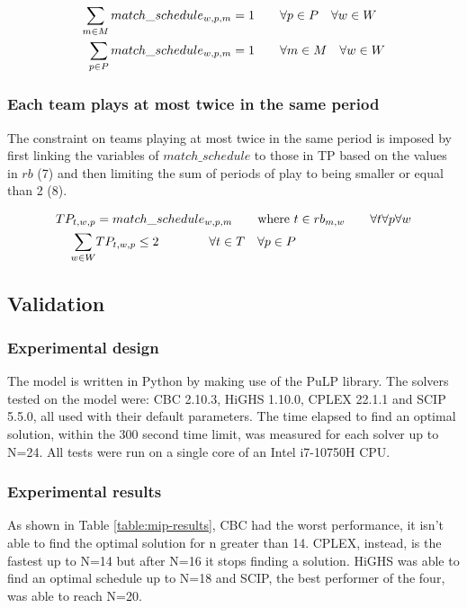 \begin{align}
    \sum_{m \in M} match\_schedule_{w,p,m} &= 1 \hspace{20px} \forall p \in P \hspace{10px} \forall w \in W\\
    \sum_{p \in P} match\_schedule_{w,p,m} &= 1 \hspace{20px} \forall m \in M \hspace{10px}\forall w \in W
\end{align}

\subsubsection{Each team plays at most twice in the same period}
The constraint on teams playing at most twice in the same period is imposed by first linking the variables of $match\_schedule$ to those in TP based on the values in $rb$ (7) and then limiting the sum of periods of play to being smaller or equal than 2 (8). 

\begin{align}
    TP_{t,w,p} &= match\_schedule_{w,p,m} \hspace{20px} \text{where}\ t \in rb_{m, w} \hspace{20px} \forall t \forall p  \forall w\\
    \sum_{w \in W} &TP_{t,w,p} \leq 2 \hspace{40px} \forall t \in T \hspace{10px} \forall p \in P
\end{align}

\subsection{Validation}
\subsubsection*{Experimental design}
The model is written in Python by making use of the PuLP library. The solvers tested on the model were: CBC 2.10.3, HiGHS 1.10.0, CPLEX 22.1.1 and SCIP 5.5.0, all used with their default parameters. The time elapsed to find an optimal solution, within the 300 second time limit, was measured for each solver up to N=24. All tests were run on a single core of an Intel i7-10750H CPU.

\subsubsection*{Experimental results}
As shown in Table \ref{table:mip-results}, CBC had the worst performance, it isn't able to find the optimal solution for n greater than 14. CPLEX, instead, is the fastest up to N=14 but after N=16 it stops finding a solution. HiGHS was able to find an optimal schedule up to N=18 and SCIP, the best performer of the four, was able to reach N=20.

